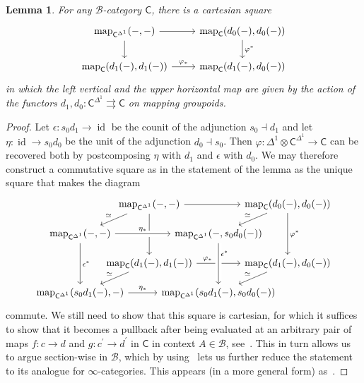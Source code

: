 \documentclass[reqno]{amsart}
\numberwithin{equation}{subsection}
\theoremstyle{plain}
\newtheorem{lemma}[equation]{Lemma}
\theoremstyle{definition}
\let\scr=\mathcal
\let\phi=\varphi
\def\BB{\scr B}
\DeclareMathOperator{\id}{id}
\DeclareMathOperator{\Map}{map}
\newcommand{\map}[1]{\Map_{#1}}
\newcommand{\I}[1]{\mathsf{#1}}
\begin{document}
\begin{lemma}
	\label{lem:mappingGroupoidArrowCategory}
	For any $\BB$-category $\I{C}$, there is a cartesian square
	\begin{equation*}
	\begin{tikzcd}
	\map{\I{C}^{\Delta^1}}(-,-)\arrow[r]\arrow[d] & \map{\I{C}}(d_0(-),d_0(-))\arrow[d, "\phi^\ast"]\\
	\map{\I{C}}(d_1(-),d_1(-))\arrow[r, "\phi_\ast"] & \map{\I{C}}(d_1(-),d_0(-))
	\end{tikzcd}
	\end{equation*}
	in which the left vertical and the upper horizontal map are given by the action of the functors $d_1,d_0\colon \I{C}^{\Delta^1}\rightrightarrows\I{C}$ on mapping groupoids.
\end{lemma}
\begin{proof}
	Let $\epsilon \colon s_0d_1\to \id$ be the counit of the adjunction $s_0\dashv d_1$ and let $\eta\colon \id\to s_0 d_0$ be the unit of the adjunction $d_0\dashv s_0$. Then $\phi\colon \Delta^1\otimes\I{C}^{\Delta^1}\to\I{C}$ can be recovered both by postcomposing $\eta$ with $d_1$ and $\epsilon$ with $d_0$. We may therefore construct a commutative square as in the statement of the lemma as the unique square that makes the diagram
	\begin{equation*}
	\begin{tikzcd}[column sep={between origins,7em}, row sep={between origins,3em}]
	&\map{\I{C}^{\Delta^1}}(-,-)\arrow[rr]\arrow[dd]\arrow[dl, "\simeq"'] && \map{\I{C}}(d_0(-),d_0(-))\arrow[dd, "\phi^\ast"]\arrow[dl, "\simeq"']\\
	\map{\I{C}^{\Delta^1}}(-,-)\arrow[rr, "\eta_\ast", crossing over]\arrow[dd, "\epsilon^\ast"] && \map{\I{C}^{\Delta^1}}(-, s_0 d_0(-))&\\
	&\map{\I{C}}(d_1(-),d_1(-))\arrow[rr, "\phi_\ast", near start]\arrow[dl, "\simeq"'] && \map{\I{C}}(d_1(-),d_0(-))\arrow[dl, "\simeq"']\\
	\map{\I{C}^{\Delta^1}}(s_0d_1(-),-)\arrow[rr, "\eta_\ast"] && \map{\I{C}^{\Delta^1}}(s_0 d_1(-), s_0 d_0(-))\arrow[from=uu, "\epsilon^\ast", crossing over, near start]&
	\end{tikzcd}
	\end{equation*}
	commute. We still need to show that this square is cartesian, for which it suffices to show that it becomes a pullback after being evaluated at an arbitrary pair of maps $f\colon c\to d$ and $g\colon c^\prime\to d^\prime$ in $\I{C}$ in context $A\in\BB$, see~\cite[Proposition~4.3.2]{Martini2021a}. This in turn allows us to argue section-wise in $\BB$, which by using~\cite[Corollary~4.6.8]{Martini2021} lets us further reduce the statement to its analogue for $\infty$-categories. This appears (in a more general form) as~\cite[Proposition~2.3]{glasman2016}.
\end{proof}
\end{document}
